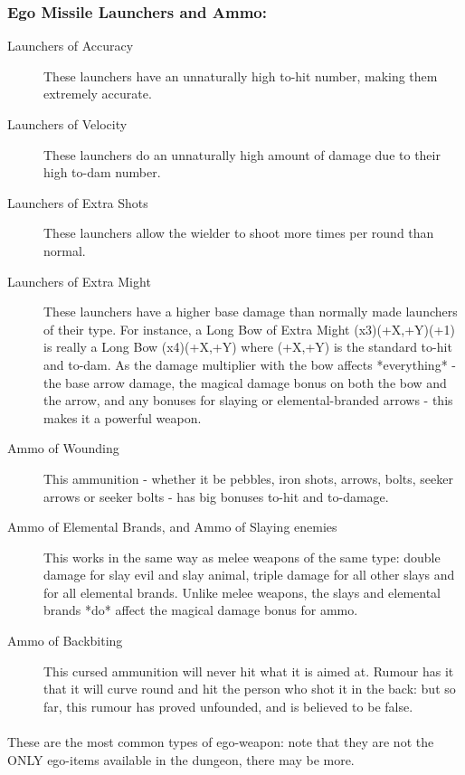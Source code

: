 \subsubsection{Ego Missile Launchers and Ammo:}
\begin{description}
\item[Launchers of Accuracy]
    These launchers have an unnaturally high to-hit number, making them
    extremely accurate.

\item[Launchers of Velocity]
    These launchers do an unnaturally high amount of damage due to their
    high to-dam number.

\item[Launchers of Extra Shots]
    These launchers allow the wielder to shoot more times per round than
    normal.

\item[Launchers of Extra Might]
    These launchers have a higher base damage than normally made launchers
    of their type. For instance, a Long Bow of Extra Might (x3)(+X,+Y)(+1)
    is really a Long Bow (x4)(+X,+Y) where (+X,+Y) is the standard to-hit
    and to-dam. As the damage multiplier with the bow affects *everything*
    - the base arrow damage, the magical damage bonus on both the bow and
    the arrow, and any bonuses for slaying or elemental-branded arrows -
    this makes it a powerful weapon.

\item[Ammo of Wounding]
    This ammunition - whether it be pebbles, iron shots, arrows, bolts,
    seeker arrows or seeker bolts - has big bonuses to-hit and to-damage.

\item[Ammo of Elemental Brands, and Ammo of Slaying enemies]
    This works in the same way as melee weapons of the same type: double
    damage for slay evil and slay animal, triple damage for all other
    slays and for all elemental brands. Unlike melee weapons, the slays
    and elemental brands *do* affect the magical damage bonus for ammo.

\item[Ammo of Backbiting]
    This cursed ammunition will never hit what it is aimed at. Rumour has
    it that it will curve round and hit the person who shot it in the
    back: but so far, this rumour has proved unfounded, and is believed
    to be false.
\end{description}

\paragraph{}
These are the most common types of ego-weapon: note that they are not the
ONLY ego-items available in the dungeon, there may be more.

